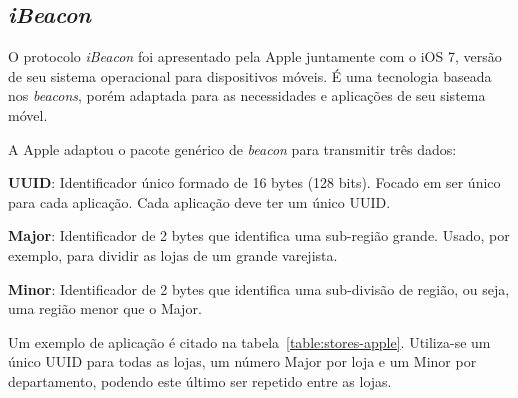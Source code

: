 \documentclass[
		12pt,				%
		openright,			%
		oneside,			%
		a4paper,			%
		chapter=TITLE,		%
		english,			%
		brazil				%
	]{abntex2}
\begin{document}
\subsection{\textit{iBeacon}}\label{sec:ibeacon}

O protocolo \textit{iBeacon} foi apresentado pela Apple juntamente com o iOS 7, versão de seu sistema operacional para dispositivos móveis. É uma tecnologia baseada nos \textit{beacons}, porém adaptada para as necessidades e aplicações de seu sistema móvel.

A Apple adaptou o pacote genérico de \textit{beacon} para transmitir três dados:

\begin{alineas}
	\item \textbf{UUID}: Identificador único formado de 16 bytes (128 bits). Focado em ser único para cada aplicação. Cada aplicação deve ter um único UUID.
	\item \textbf{Major}: Identificador de 2 bytes que identifica uma sub-região grande. Usado, por exemplo, para dividir as lojas de um grande varejista.
	\item \textbf{Minor}: Identificador de 2 bytes que identifica uma sub-divisão de região, ou seja, uma região menor que o Major.
\end{alineas}

Um exemplo de aplicação é citado na tabela~\ref{table:stores-apple}. Utiliza-se um único UUID para todas as lojas, um número Major por loja e um Minor por departamento, podendo este último ser repetido entre as lojas.

\begin{table}[htb]
\end{table}
\end{document}
